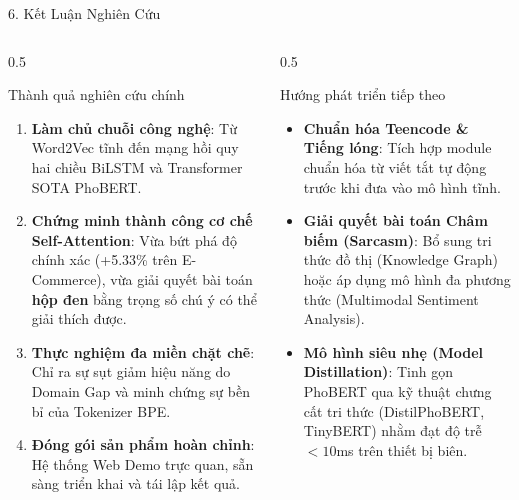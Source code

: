 \documentclass[aspectratio=169, 10pt]{beamer}
\begin{document}
\begin{frame}{6. Kết Luận Nghiên Cứu}
  \begin{columns}[t]
    \begin{column}{0.5\textwidth}
      \begin{block}{Thành quả nghiên cứu chính}
        \fontsize{7.5}{9.5}\selectfont
        \begin{enumerate}
          \item \textbf{Làm chủ chuỗi công nghệ}: Từ Word2Vec tĩnh đến mạng hồi quy hai chiều BiLSTM và Transformer SOTA PhoBERT.
          \item \textbf{Chứng minh thành công cơ chế Self-Attention}: Vừa bứt phá độ chính xác (+5.33\% trên E-Commerce), vừa giải quyết bài toán \textbf{hộp đen} bằng trọng số chú ý có thể giải thích được.
          \item \textbf{Thực nghiệm đa miền chặt chẽ}: Chỉ ra sự sụt giảm hiệu năng do Domain Gap và minh chứng sự bền bỉ của Tokenizer BPE.
          \item \textbf{Đóng gói sản phẩm hoàn chỉnh}: Hệ thống Web Demo trực quan, sẵn sàng triển khai và tái lập kết quả.
        \end{enumerate}
      \end{block}
    \end{column}

    \begin{column}{0.5\textwidth}
      \begin{block}{Hướng phát triển tiếp theo}
        \fontsize{7.5}{9.5}\selectfont
        \begin{itemize}
          \item \textbf{Chuẩn hóa Teencode \& Tiếng lóng}: Tích hợp module chuẩn hóa từ viết tắt tự động trước khi đưa vào mô hình tĩnh.
          \item \textbf{Giải quyết bài toán Châm biếm (Sarcasm)}: Bổ sung tri thức đồ thị (Knowledge Graph) hoặc áp dụng mô hình đa phương thức (Multimodal Sentiment Analysis).
          \item \textbf{Mô hình siêu nhẹ (Model Distillation)}: Tinh gọn PhoBERT qua kỹ thuật chưng cất tri thức (DistilPhoBERT, TinyBERT) nhằm đạt độ trễ $< 10$ms trên thiết bị biên.
        \end{itemize}
      \end{block}
    \end{column}
  \end{columns}
\end{frame}
\end{document}
